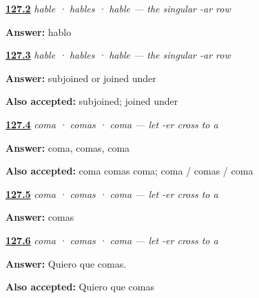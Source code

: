 \noindent\begin{minipage}[t]{\linewidth}
\raggedright
\hyperlink{review-ES-C18-subjuntivo-recipe}{\textbf{127.2}} \emph{hable · hables · hable — the singular -ar row}\par
\small \textbf{Answer:} hablo\par
\end{minipage}\par\medskip

\noindent\begin{minipage}[t]{\linewidth}
\raggedright
\hyperlink{review-ES-C18-subjuntivo-name}{\textbf{127.3}} \emph{hable · hables · hable — the singular -ar row}\par
\small \textbf{Answer:} subjoined or joined under\par
\footnotesize \textbf{Also accepted:} subjoined; joined under
\end{minipage}\par\medskip

\noindent\begin{minipage}[t]{\linewidth}
\raggedright
\hyperlink{review-ES-C18-comer-subjuntivo-forms}{\textbf{127.4}} \emph{coma · comas · coma — let -er cross to a}\par
\small \textbf{Answer:} coma, comas, coma\par
\footnotesize \textbf{Also accepted:} coma comas coma; coma / comas / coma
\end{minipage}\par\medskip

\noindent\begin{minipage}[t]{\linewidth}
\raggedright
\hyperlink{review-ES-C18-comer-subjuntivo-fact-wish}{\textbf{127.5}} \emph{coma · comas · coma — let -er cross to a}\par
\small \textbf{Answer:} comas\par
\end{minipage}\par\medskip

\noindent\begin{minipage}[t]{\linewidth}
\raggedright
\hyperlink{review-ES-C18-comer-subjuntivo-wanted}{\textbf{127.6}} \emph{coma · comas · coma — let -er cross to a}\par
\small \textbf{Answer:} Quiero que comas.\par
\footnotesize \textbf{Also accepted:} Quiero que comas
\end{minipage}\par\medskip

